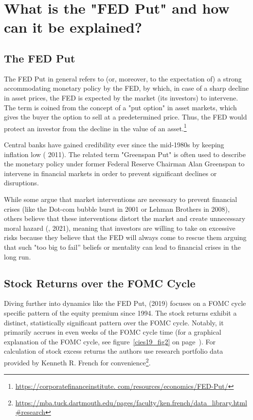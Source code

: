 \chapter{What is the "FED Put" and how can it be explained?}
\section{The FED Put}
The FED Put in general refers to (or, moreover, to the expectation of) a strong accommodating monetary policy by the FED, by which, in case of a sharp decline in asset prices, the FED is expected by the market (its investors) to intervene. The term is coined from the concept of a "put option" in asset markets, which gives the buyer the option to sell at a predetermined price. Thus, the FED would protect an investor from the decline in the value of an asset.\footnote{\url{https://corporatefinanceinstitute. com/resources/economics/FED-Put/}}

Central banks have gained credibility ever since the mid-1980s by keeping inflation low (\cite{hall_is_2011} 2011). The related term "Greenspan Put" is often used to describe the monetary policy under former Federal Reserve Chairman Alan Greenspan to intervene in financial markets in order to prevent significant declines or disruptions. 

While some argue that market interventions are necessary to prevent financial crises (like the Dot-com bubble burst in 2001 or Lehman Brothers in 2008), others believe that these interventions distort the market and create unnecessary moral hazard (\cite{cieslak_economics_2021},  2021),  meaning that investors are willing to take on excessive risks because they believe that the FED will always come to rescue them arguing that such "too big to fail” beliefs or mentality can lead to financial crises in the long run.

\section{Stock Returns over the FOMC Cycle}

Diving further into dynamics like the FED Put,  \cite{cieslak_stock_2019} (2019) focuses on a FOMC cycle specific pattern of the equity premium since 1994. 
The stock returns exhibit a distinct,  statistically significant pattern over the FOMC cycle.  Notably,  it primarily accrues in even weeks of the FOMC cycle time (for a graphical explanation of the FOMC cycle, see figure~\ref{cies19_fig2} on page~\pageref{cies19_fig2}). For calculation of stock excess returns the authors use research portfolio data provided by Kenneth R. French for convenience\footnote{\url{https://mba.tuck.dartmouth.edu/pages/faculty/ken.french/data_library.html\#research}}.

